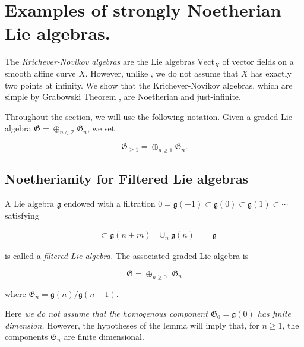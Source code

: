 \documentclass[11pt, letterpaper, reqno]{amsart}
\theoremstyle{definition}
\newcommand{\Z}{{\mathbb Z}}
\newcommand{\g}{\mathfrak g}
\newcommand{\fg}{\mathfrak{g}}
\newcommand{\fG}{\mathfrak{G}}
\newcommand{\Vect}{\mathrm{Vect}}
\begin{document}
\section{Examples of strongly Noetherian Lie algebras.}\label{ExKN}

\noindent
The {\it Krichever-Novikov algebras}
are the Lie algebras $\Vect_X$ of vector fields on a smooth affine curve $X$.  However, unlike
 \cite{KN}, we do not assume that 
 $X$ has exactly two points at infinity. We show that the Krichever-Novikov algebras, which are simple by Grabowski Theorem \cite{Grab1}, are Noetherian
 and just-infinite. 
 
 
 
Throughout the section, we will use the following notation. Given a graded Lie algebra 
$\fG=\oplus_{n\in \Z} \fG_n$, we set

$$\fG_{\geq 1}=\oplus_{n\geq 1} \fG_n.$$





\subsection{Noetherianity for Filtered Lie algebras}



A Lie algebra $\g$ endowed  with a filtration
$0=\g(-1)\subset\fg(0)\subset \fg(1)\subset\cdots$ satisfying

\begin{align*}
[\fg(n),\fg(m)]&\subset \fg(n+m) & \cup_n\g(n)&=\g
\end{align*}

\noindent is called a {\it filtered  Lie algebra.}
The associated graded Lie algebra is

$$\fG=\oplus_{n\geq  0}\,\,\fG_n$$


\noindent where $\fG_n=\fg(n)/\fg(n-1)$.
 


\noindent Here {\it we do not assume that the homogenous component $\fG_0=\fg(0)$  has finite dimension.} However,  the hypotheses of the lemma will
imply that,  for $n\geq 1$, the components 
$\fG_{n}$ are finite dimensional.
\end{document}
